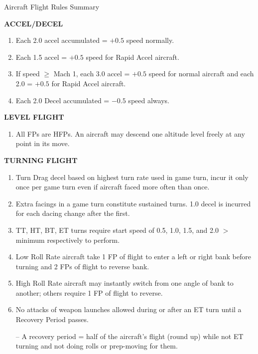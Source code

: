 \begin{table*}

\newcommand{\heading}[1]{\smallskip\textbf{\MakeUppercase{#1}}\par\smallskip}
\newcommand{\subheading}[1]{\smallskip\textbf{#1}\par\smallskip}

\caption{Aircraft Flight Rules Summary}
\medskip
\footnotesize
\begin{multicols}{2}

\heading{Accel/Decel}
\begin{enumerate}[nosep]
    \item Each 2.0 accel accumulated = $+0.5$ speed normally.
    \item Each 1.5 accel = $+0.5$ speed for Rapid Accel aircraft.
    \item If speed $\ge$ Mach 1, each 3.0 accel = $+0.5$ speed for normal aircraft and each 2.0 = $+0.5$ for Rapid Accel aircraft.
    \item Each 2.0 Decel accumulated = $-0.5$ speed always.
\end{enumerate}

\heading{Level Flight}
\begin{enumerate}[nosep]
    \item All FPs are HFPs. An aircraft may descend one altitude level freely at any point in its move.
\end{enumerate}

\heading{Turning Flight}
\begin{enumerate}[nosep]
    \item Turn Drag decel based on highest turn rate used in game turn, incur it only once per game turn even if aircraft faced more often than once.
    \item Extra facings in a game turn constitute sustained turns. 1.0 decel is incurred for each dacing change after the first.
    \item TT, HT, BT, ET turns require start speed of 0.5, 1.0, 1.5, and 2.0 $>$ minimum respectively to perform.
    \item Low Roll Rate aircraft take 1 FP of flight to enter a left or right bank before turning and 2 FPs of flight to reverse bank.
    \item High Roll Rate aircraft may instantly switch from one angle of bank to another; others require 1 FP of flight to reverse.
    \item No attacks of weapon launches allowed during or after an ET turn until a Recovery Period passes.
    \item[--] A recovery period = half of the aircraft's flight (round up) while not ET turning and not doing rolls or prep-moving for them.
\end{enumerate}


\end{multicols}
\end{table*}
